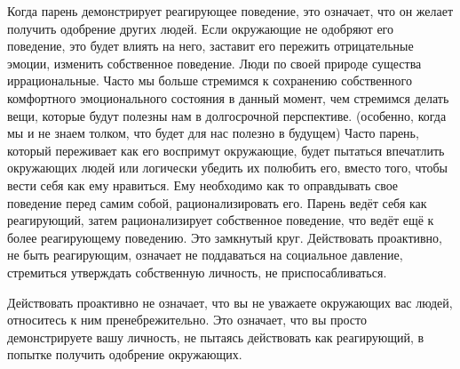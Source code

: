 Когда парень демонстрирует реагирующее поведение, это означает, что он желает получить одобрение других людей. Если окружающие не одобряют его поведение, это будет влиять на него, заставит его пережить отрицательные эмоции, изменить собственное поведение. Люди по своей природе существа иррациональные. Часто мы больше стремимся к сохранению собственного комфортного эмоционального состояния в данный момент, чем стремимся делать вещи, которые будут полезны нам в долгосрочной перспективе. (особенно, когда мы и не знаем толком, что будет для нас полезно в будущем) Часто парень, который переживает как его воспримут окружающие, будет пытаться впечатлить окружающих людей или логически убедить их полюбить его, вместо того, чтобы вести себя как ему нравиться. Ему необходимо как то оправдывать свое поведение перед самим собой, рационализировать его. Парень ведёт себя как реагирующий, затем рационализирует собственное поведение, что ведёт ещё к более реагирующему поведению. Это замкнутый круг. Действовать проактивно, не быть реагирующим, означает не поддаваться на социальное давление, стремиться утверждать собственную личность, не приспосабливаться.

\RULE  Действовать проактивно не означает, что вы не уважаете окружающих вас людей, относитесь к ним пренебрежительно. Это означает, что вы просто демонстрируете вашу личность, не пытаясь действовать как реагирующий, в попытке получить одобрение окружающих.

